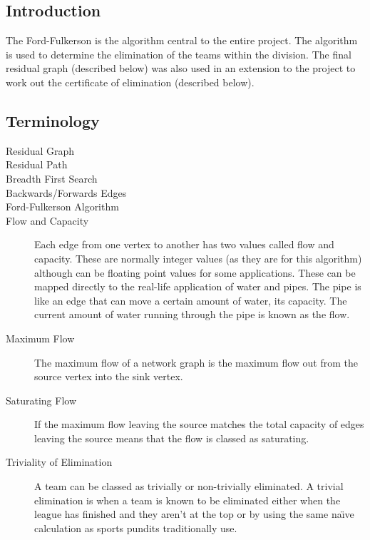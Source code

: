 \subsection{Introduction}

The Ford-Fulkerson is the algorithm central to the entire project. The
algorithm is used to determine the elimination of the teams within the
division. The final residual graph (described below) was also used in an
extension to the project to work out the certificate of elimination
(described below).

\subsection{Terminology}

\begin{description}

\item[Residual Graph]

\item[Residual Path]

\item[Breadth First Search]

\item[Backwards/Forwards Edges]

\item[Ford-Fulkerson Algorithm]

\item[Flow and Capacity] Each edge from one vertex to another has two values
called flow and capacity. These are normally integer values (as they are for 
this algorithm) although can be floating point values for some applications.
These can be mapped directly to the real-life application of water and pipes.
The pipe is like an edge that can move a certain amount of water, its capacity.
The current amount of water running through the pipe is known as the flow.

\item[Maximum Flow] The maximum flow of a network graph is the maximum flow
out from the source vertex into the sink vertex.

\item[Saturating Flow] If the maximum flow leaving the source matches the total
capacity of edges leaving the source means that the flow is classed as
saturating.

\item[Triviality of Elimination] A team can be classed as trivially or
non-trivially eliminated. A trivial elimination is when a team is known to be
eliminated either when the league has finished and they aren't at the top or
by using the same na\"{\i}ve calculation as sports pundits traditionally
use.


\end{description}
